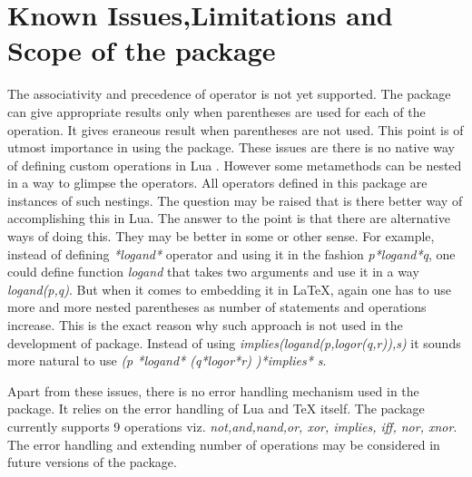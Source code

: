 \documentclass{article}
\begin{document}
\section{Known Issues,Limitations and Scope of the package} The associativity and precedence of operator is not yet supported. The package can give appropriate results only when parentheses are used for each of the operation. It gives eraneous result when  parentheses are not used. This point is of utmost importance in using the package. These issues are there is no native way of defining custom operations in Lua \cite{online.luacustomoperator}. However some metamethods can be nested in a way to glimpse the operators. All operators defined in this package are instances of such nestings. The question may be raised that is there better way of accomplishing this in Lua. The answer to the point is that there are alternative ways of doing this. They may be better in some or other sense. For example, instead of defining \emph{*logand*} operator and using it in the fashion \emph{p*logand*q}, one could define function \emph{logand} that takes two arguments and use it in a way \emph{logand(p,q)}. But when it comes to embedding it in LaTeX, again one has to use more and more nested parentheses as number of statements and operations increase. This is the exact reason why such approach is not used in the development of package. Instead of using \emph{implies(logand(p,logor(q,r)),s)} it sounds more natural to use \emph{(p *logand* (q*logor*r) )*implies* s}. 

Apart from these issues, there is no error handling mechanism used in the package. It relies on the error handling of Lua and TeX itself. The package currently supports 9 operations viz. \emph{not,and,nand,or, xor, implies, iff, nor, xnor}. The error handling and extending number of operations may be considered in future versions of the package. 

\printbibliography
\end{document}
